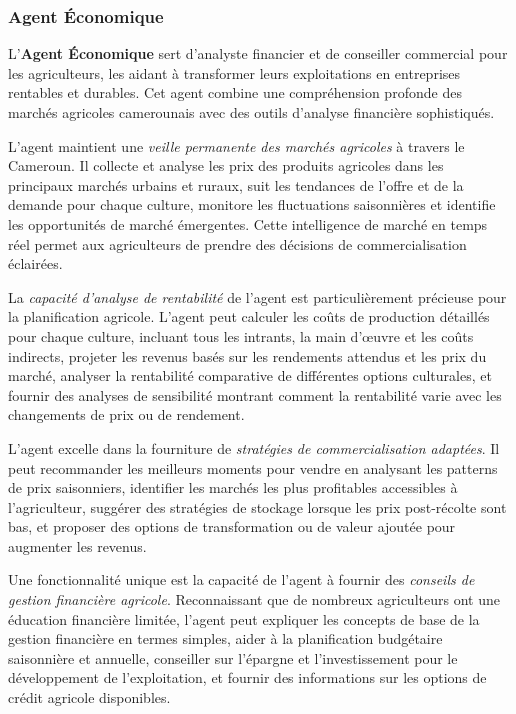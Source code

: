 \subsubsection{Agent Économique}

L'\textbf{Agent Économique} sert d'analyste financier et de conseiller commercial pour les agriculteurs, les aidant à transformer leurs exploitations en entreprises rentables et durables. Cet agent combine une compréhension profonde des marchés agricoles camerounais avec des outils d'analyse financière sophistiqués.

L'agent maintient une \emph{veille permanente des marchés agricoles} à travers le Cameroun. Il collecte et analyse les prix des produits agricoles dans les principaux marchés urbains et ruraux, suit les tendances de l'offre et de la demande pour chaque culture, monitore les fluctuations saisonnières et identifie les opportunités de marché émergentes. Cette intelligence de marché en temps réel permet aux agriculteurs de prendre des décisions de commercialisation éclairées.

La \emph{capacité d'analyse de rentabilité} de l'agent est particulièrement précieuse pour la planification agricole. L'agent peut calculer les coûts de production détaillés pour chaque culture, incluant tous les intrants, la main d'œuvre et les coûts indirects, projeter les revenus basés sur les rendements attendus et les prix du marché, analyser la rentabilité comparative de différentes options culturales, et fournir des analyses de sensibilité montrant comment la rentabilité varie avec les changements de prix ou de rendement.

L'agent excelle dans la fourniture de \emph{stratégies de commercialisation adaptées}. Il peut recommander les meilleurs moments pour vendre en analysant les patterns de prix saisonniers, identifier les marchés les plus profitables accessibles à l'agriculteur, suggérer des stratégies de stockage lorsque les prix post-récolte sont bas, et proposer des options de transformation ou de valeur ajoutée pour augmenter les revenus.

Une fonctionnalité unique est la capacité de l'agent à fournir des \emph{conseils de gestion financière agricole}. Reconnaissant que de nombreux agriculteurs ont une éducation financière limitée, l'agent peut expliquer les concepts de base de la gestion financière en termes simples, aider à la planification budgétaire saisonnière et annuelle, conseiller sur l'épargne et l'investissement pour le développement de l'exploitation, et fournir des informations sur les options de crédit agricole disponibles.


